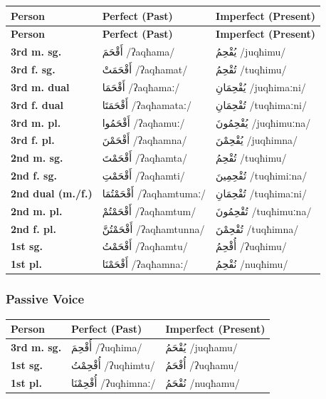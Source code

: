 \documentclass[letterpaper,12pt]{article}
\begin{document}
\begin{longtable}{|>{\raggedright}p{3.5cm}|p{5cm}|p{5cm}|}
\hline
\textbf{Person} & \textbf{Perfect (Past)} & \textbf{Imperfect (Present)} \\
\hline
\endfirsthead
\hline
\textbf{Person} & \textbf{Perfect (Past)} & \textbf{Imperfect (Present)} \\
\hline
\endhead
\textbf{3rd m. sg.} & \textarabic{أَقْحَمَ} /ʔaqħama/ & \textarabic{يُقْحِمُ} /juqħimu/ \\
\hline
\textbf{3rd f. sg.} & \textarabic{أَقْحَمَتْ} /ʔaqħamat/ & \textarabic{تُقْحِمُ} /tuqħimu/ \\
\hline
\textbf{3rd m. dual} & \textarabic{أَقْحَمَا} /ʔaqħamaː/ & \textarabic{يُقْحِمَانِ} /juqħimaːni/ \\
\hline
\textbf{3rd f. dual} & \textarabic{أَقْحَمَتَا} /ʔaqħamataː/ & \textarabic{تُقْحِمَانِ} /tuqħimaːni/ \\
\hline
\textbf{3rd m. pl.} & \textarabic{أَقْحَمُوا} /ʔaqħamuː/ & \textarabic{يُقْحِمُونَ} /juqħimuːna/ \\
\hline
\textbf{3rd f. pl.} & \textarabic{أَقْحَمْنَ} /ʔaqħamna/ & \textarabic{يُقْحِمْنَ} /juqħimna/ \\
\hline
\textbf{2nd m. sg.} & \textarabic{أَقْحَمْتَ} /ʔaqħamta/ & \textarabic{تُقْحِمُ} /tuqħimu/ \\
\hline
\textbf{2nd f. sg.} & \textarabic{أَقْحَمْتِ} /ʔaqħamti/ & \textarabic{تُقْحِمِينَ} /tuqħimiːna/ \\
\hline
\textbf{2nd dual (m./f.)} & \textarabic{أَقْحَمْتُمَا} /ʔaqħamtumaː/ & \textarabic{تُقْحِمَانِ} /tuqħimaːni/ \\
\hline
\textbf{2nd m. pl.} & \textarabic{أَقْحَمْتُمْ} /ʔaqħamtum/ & \textarabic{تُقْحِمُونَ} /tuqħimuːna/ \\
\hline
\textbf{2nd f. pl.} & \textarabic{أَقْحَمْتُنَّ} /ʔaqħamtunna/ & \textarabic{تُقْحِمْنَ} /tuqħimna/ \\
\hline
\textbf{1st sg.} & \textarabic{أَقْحَمْتُ} /ʔaqħamtu/ & \textarabic{أُقْحِمُ} /ʔuqħimu/ \\
\hline
\textbf{1st pl.} & \textarabic{أَقْحَمْنَا} /ʔaqħamnaː/ & \textarabic{نُقْحِمُ} /nuqħimu/ \\
\hline
\end{longtable}

\subsubsection*{Passive Voice}
\begin{longtable}{|>{\raggedright}p{3.5cm}|p{5cm}|p{5cm}|}
\hline
\textbf{Person} & \textbf{Perfect (Past)} & \textbf{Imperfect (Present)} \\
\hline
\textbf{3rd m. sg.} & \textarabic{أُقْحِمَ} /ʔuqħima/ & \textarabic{يُقْحَمُ} /juqħamu/ \\
\hline
\textbf{1st sg.} & \textarabic{أُقْحِمْتُ} /ʔuqħimtu/ & \textarabic{أُقْحَمُ} /ʔuqħamu/ \\
\hline
\textbf{1st pl.} & \textarabic{أُقْحِمْنَا} /ʔuqħimnaː/ & \textarabic{نُقْحَمُ} /nuqħamu/ \\
\hline
\end{longtable}
\end{document}

